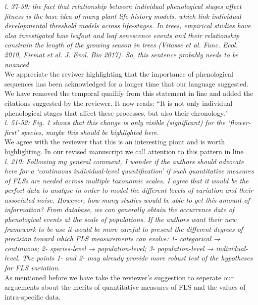 \documentclass{article}[11pt]
\begin{document}
{\emph{l. 37-39: the fact that relationship between individual phenological stages affect fitness is the base idea of many plant life-history models, which link individual developmental threshold models across life-stages. In trees, empirical studies have also investigated how leafout and leaf senescence events and their relationship constrain the length of the growing season in trees (Vitasse et al. Func. Ecol. 2010, Firmat et al. J. Evol. Bio 2017). So, this sentence probably needs to be nuanced.}\\

\noindent We appreciate the reviwer highlighting that the importance of phenological sequences has been acknowledged for a longer time that our language suggested. We have removed the temporal quailify from this statement in line  and added the citations suggested by the reviewer. It now reads: ``It is not only individual phenological stages that affect these processes, but also their chronology."\\

\emph{l. 51-52: Fig. 1 shows that this change is only visible (significant) for the ‘flower-first’ species, maybe this should be highlighted here.}\\

\noident We agree with the reviewer that this is an interesting piont and is worth highlighting. In our revised manuscript we call attention to this pattern in line .\\

\emph{l. 210: Following my general comment, I wonder if the authors should advocate here for a ‘continuous individual-level quantification’ if such quantitative measures of FLSs are needed across multiple taxonomic scales. I agree that it would be the perfect data to analyse in order to model the different levels of variation and their associated noise. However, how many studies would be able to get this amount of information? From database, we can generally obtain the occurrence date of phenological events at the scale of populations. If the authors want their new framework to be use it would be more careful to present the different degrees of precision toward which FLS measurements can evolve: 1- categorical → continuous; 2- species-level → population-level; 3- population-level → individual-level. The points 1- and 2- may already provide more robust test of the hypotheses for FLS variation.}\\

\noindent As mentioned before we have take the reviewer's suggestion to seperate our arguements about the merits of quantitative measures of FLS and the values of intra-specific data.\\


}
\end{document}

